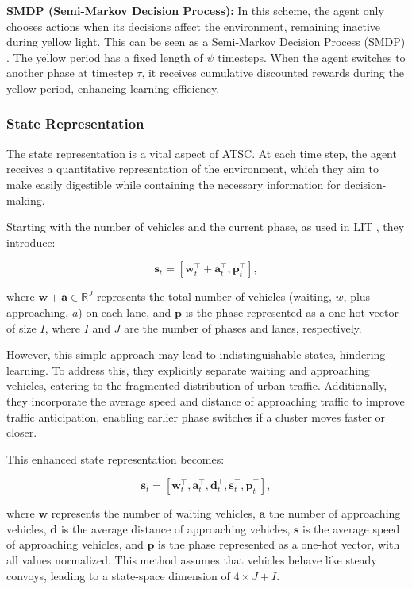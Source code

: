 \textbf{SMDP (Semi-Markov Decision Process):} In this scheme, the agent only chooses actions when its decisions affect the environment, remaining inactive during yellow light. This can be seen as a Semi-Markov Decision Process (SMDP) \cite{sutton1999between}. The yellow period has a fixed length of \(\psi\) timesteps. When the agent switches to another phase at timestep \(\tau\), it receives cumulative discounted rewards during the yellow period, enhancing learning efficiency.

\subsubsection{State Representation}
\label{sec:state_representation}

The state representation is a vital aspect of ATSC. At each time step, the agent receives a quantitative representation of the environment, which they aim to make easily digestible while containing the necessary information for decision-making.

Starting with the number of vehicles and the current phase, as used in LIT \cite{zheng2019diagnosing}, they introduce:

\[
\boldsymbol{s}_t = [ \boldsymbol{w}_t^\intercal + \boldsymbol{a}_t^\intercal , \boldsymbol{p}_t^\intercal ] ,
\]

where \(\boldsymbol{w} + \boldsymbol{a} \in \mathbb{R}^J\) represents the total number of vehicles (waiting, \(w\), plus approaching, \(a\)) on each lane, and \(\boldsymbol{p}\) is the phase represented as a one-hot vector of size \(I\), where \(I\) and \(J\) are the number of phases and lanes, respectively.

However, this simple approach may lead to indistinguishable states, hindering learning. To address this, they explicitly separate waiting and approaching vehicles, catering to the fragmented distribution of urban traffic. Additionally, they incorporate the average speed and distance of approaching traffic to improve traffic anticipation, enabling earlier phase switches if a cluster moves faster or closer.

This enhanced state representation becomes:

\[
\boldsymbol{s}_t = [\boldsymbol{w}_t^\intercal, \boldsymbol{a}_t^\intercal, \boldsymbol{d}_t^\intercal, \boldsymbol{s}_t^\intercal, \boldsymbol{p}_t^\intercal],
\]

where \(\boldsymbol{w}\) represents the number of waiting vehicles, \(\boldsymbol{a}\) the number of approaching vehicles, \(\boldsymbol{d}\) is the average distance of approaching vehicles, \(\boldsymbol{s}\) is the average speed of approaching vehicles, and \(\boldsymbol{p}\) is the phase represented as a one-hot vector, with all values normalized. This method assumes that vehicles behave like steady convoys, leading to a state-space dimension of \(4 \times J + I\).

